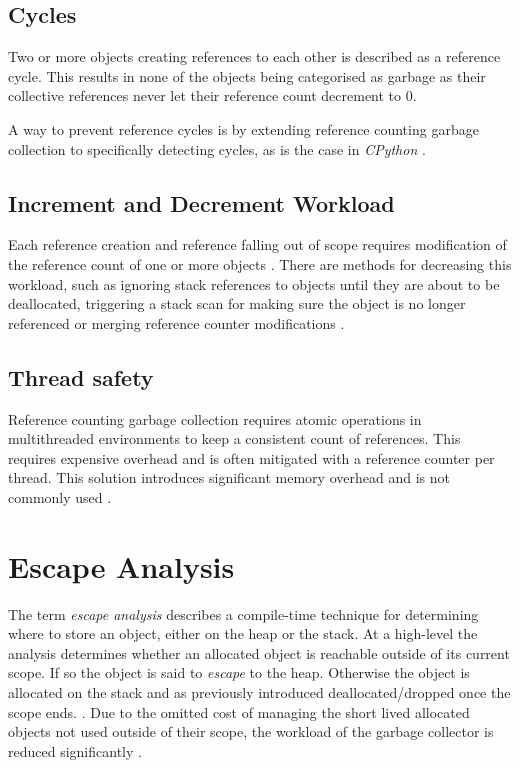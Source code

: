 \subsection{Cycles}
\label{sec:reference_counting_cycles}

Two or more objects creating references to each other is described as a
reference cycle. This results in none of the objects being categorised as
garbage as their collective references never let their reference count
decrement to 0. 

A way to prevent reference cycles is by extending reference counting garbage
collection to specifically detecting cycles, as is the case in \textit{CPython}
\cite[1.10 Reference Counts]{python-extending-gc_2008}. 

\subsection{Increment and Decrement Workload}

Each reference creation and reference falling out of scope requires
modification of the reference count of one or more objects \cite[6.1 Immediate
Reference Counting]{gc-generational-scavenging_1984}. There are methods for
decreasing this workload, such as ignoring stack references to objects until
they are about to be deallocated, triggering a stack scan for making sure the
object is no longer referenced \cite[6.2 Deferred Reference
Couting]{gc-generational-scavenging_1984} or merging reference counter
modifications \cite[Abstract]{gc-on-the-fly_2006}.

\subsection{Thread safety}

Reference counting garbage collection requires atomic operations in
multithreaded environments to keep a consistent count of references. This
requires expensive overhead and is often mitigated with a reference counter per
thread. This solution introduces significant memory overhead and is not
commonly used \cite[1.2 Reference-Counting on a
Multiprocessor]{gc-on-the-fly_2006}.

\section{Escape Analysis}

The term \textit{escape analysis} describes a compile-time technique for
determining where to store an object, either on the heap or the stack. At a
high-level the analysis determines whether an allocated object is reachable
outside of its current scope. If so the object is said to \textit{escape} to
the heap. Otherwise the object is allocated on the stack and as previously
introduced deallocated/dropped once the scope ends.
\cite[\texttt{l.18}]{go-escape}. Due to the omitted cost of managing the short
lived allocated objects not used outside of their scope, the workload of the
garbage collector is reduced significantly \cite[Escape
analysis]{go_gcguide_2022}.


